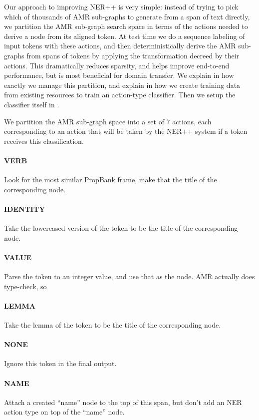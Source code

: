 \documentclass[11pt]{article}
\begin{document}
Our approach to improving NER++ is very simple: instead of trying to pick which of thousands of AMR sub-graphs to generate from a span of text directly, we partition the AMR sub-graph search space in terms of the actions needed to derive a node from its aligned token. At test time we do a sequence labeling of input tokens with these actions, and then deterministically derive the AMR sub-graphs from spans of tokens by applying the transformation decreed by their actions. This dramatically reduces sparsity, and helps improve end-to-end performance, but is most beneficial for domain transfer. We explain in  how exactly we manage this partition, and explain in  how we create training data from existing resources to train an action-type classifier. Then we setup the classifier itself in .


We partition the AMR sub-graph space into a set of 7 actions, each corresponding to an action that will be taken by the NER++ system if a token receives this classification.

\paragraph{VERB} Look for the most similar PropBank frame, make that the title of the corresponding node.
\paragraph{IDENTITY} Take the lowercased version of the token to be the title of the corresponding node.
\paragraph{VALUE} Parse the token to an integer value, and use that as the node. AMR actually does type-check, so 
\paragraph{LEMMA} Take the lemma of the token to be the title of the corresponding node.
\paragraph{NONE} Ignore this token in the final output.
\paragraph{NAME} Attach a created ``name'' node to the top of this span, but don't add an NER action type on top of the ``name'' node.
\end{document}
